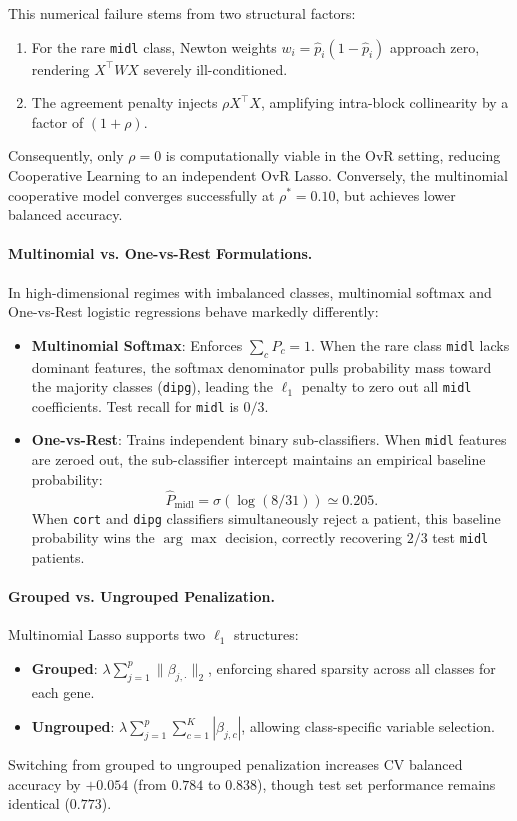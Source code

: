 \documentclass[a4paper,11pt]{paper}
\theoremstyle{plain}
\theoremstyle{definition}
\theoremstyle{remark}
\begin{document}
This numerical failure stems from two structural factors:
\begin{enumerate}
    \item For the rare \texttt{midl} class, Newton weights $w_i = \hat p_i(1 - \hat p_i)$ approach zero, rendering $X^\top W X$ severely ill-conditioned.
    \item The agreement penalty injects $\rho X^\top X$, amplifying intra-block collinearity by a factor of $(1 + \rho)$.
\end{enumerate}
Consequently, only $\rho = 0$ is computationally viable in the OvR setting, reducing Cooperative Learning to an independent OvR Lasso. Conversely, the multinomial cooperative model converges successfully at $\rho^* = 0.10$, but achieves lower balanced accuracy.

\paragraph{Multinomial vs. One-vs-Rest Formulations.}
In high-dimensional regimes with imbalanced classes, multinomial softmax and One-vs-Rest logistic regressions behave markedly differently:
\begin{itemize}
    \item \textbf{Multinomial Softmax}: Enforces $\sum_c P_c = 1$. When the rare class \texttt{midl} lacks dominant features, the softmax denominator pulls probability mass toward the majority classes (\texttt{dipg}), leading the $\ell_1$ penalty to zero out all \texttt{midl} coefficients. Test recall for \texttt{midl} is $0/3$.
    \item \textbf{One-vs-Rest}: Trains independent binary sub-classifiers. When \texttt{midl} features are zeroed out, the sub-classifier intercept maintains an empirical baseline probability:
          $$\hat P_{\text{midl}} = \sigma(\log(8/31)) \simeq 0.205.$$
          When \texttt{cort} and \texttt{dipg} classifiers simultaneously reject a patient, this baseline probability wins the $\arg\max$ decision, correctly recovering $2/3$ test \texttt{midl} patients.
\end{itemize}

\paragraph{Grouped vs. Ungrouped Penalization.}
Multinomial Lasso supports two $\ell_1$ structures:
\begin{itemize}
    \item \textbf{Grouped}: $\lambda \sum_{j=1}^p \|\beta_{j,\cdot}\|_2$, enforcing shared sparsity across all classes for each gene.
    \item \textbf{Ungrouped}: $\lambda \sum_{j=1}^p \sum_{c=1}^K |\beta_{j,c}|$, allowing class-specific variable selection.
\end{itemize}
Switching from grouped to ungrouped penalization increases CV balanced accuracy by $+0.054$ (from $0.784$ to $0.838$), though test set performance remains identical ($0.773$).
\end{document}
